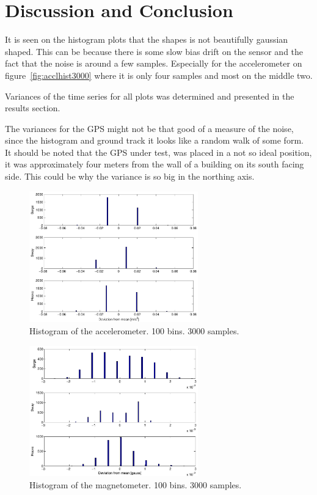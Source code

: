 \section{Discussion and Conclusion}
It is seen on the histogram plots that the shapes is not beautifully
gaussian shaped. This can be because there is some slow bias drift on
the sensor and the fact that the noise is around a few samples.
Especially for the accelerometer on figure~\vref{fig:acclhist3000}
where it is only four samples and most on the middle two.

Variances of the time series for all plots was determined and
presented in the results section.

The variances for the GPS might not be that good of a measure of the
noise, since the histogram and ground track it looks like a random
walk of some form. It should be noted that the GPS under test, was
placed in a not so ideal position, it was approximately four meters
from the wall of a building on its south facing side. This could be
why the variance is so big in the northing axis.

         
\newpage

\begin{figure}[h]
	\centering
	\includegraphics[width=0.65\textwidth]{pdf/acclhist3000}
	\caption{Histogram of the accelerometer. 100 bins. 3000 samples.}
	\label{fig:acclhist3000}
\end{figure}

\begin{figure}[h]
	\centering
	\includegraphics[width=0.65\textwidth]{pdf/magnhist3000}
	\caption{Histogram of the magnetometer. 100 bins. 3000 samples.}
	\label{fig:magnhist3000}
\end{figure}

